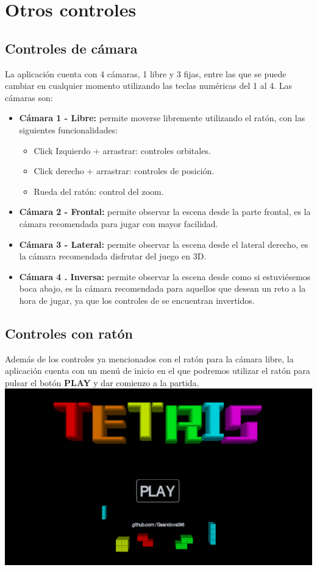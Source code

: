 \documentclass[11pt,a4paper]{article}
\begin{document}
\newpage

\section{Otros controles}
\subsection{Controles de cámara}

La aplicación cuenta con 4 cámaras, 1 libre y 3 fijas, entre las que se puede cambiar en cualquier momento utilizando las teclas numéricas del 1 al 4. Las cámaras son:

\begin{itemize}
    \item \textbf{Cámara 1 - Libre:} permite moverse libremente utilizando el ratón, con las siguientes funcionalidades:
    \begin{itemize}
        \item Click Izquierdo + arrastrar: controles orbitales.
        \item Click derecho + arrastrar: controles de posición.
        \item Rueda del ratón: control del zoom.
    \end{itemize}
    \item \textbf{Cámara 2 - Frontal:} permite observar la escena desde la parte frontal, es la cámara recomendada para jugar con mayor facilidad.
    \item \textbf{Cámara 3 - Lateral:} permite observar la escena desde el lateral derecho, es la cámara recomendada disfrutar del juego en 3D.
    \item \textbf{Cámara 4 . Inversa:} permite observar la escena desde como si estuviésemos boca abajo, es la cámara recomendada para aquellos que desean un reto a la hora de jugar, ya que los controles de se encuentran invertidos.
\end{itemize}

\subsection{Controles con ratón}

Además de los controles ya mencionados con el ratón para la cámara libre, la aplicación cuenta con un menú de inicio en el que podremos utilizar el ratón para pulsar el botón \textbf{PLAY} y dar comienzo a la partida.\\

\includegraphics[scale=0.25]{menu.jpg}
\end{document}
